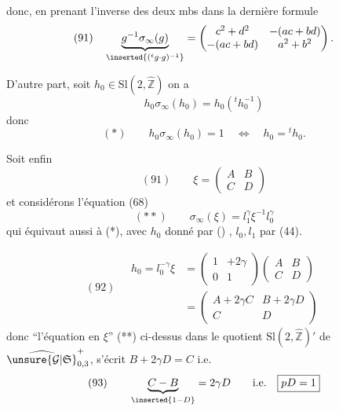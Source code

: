 
donc, en prenant l'inverse des deux mbs dans
la dernière formule
\[
(91)\quad \underbrace{g^{-1}\sigma_\infty(g)}_{\inserted{({}^t g\cdot g)^{-1}}}
=\begin{pmatrix}c^2+d^2&-(ac+bd)\\-(ac+bd)&a^2+b^2\end{pmatrix}.
\]

D'autre part, soit
$h_0\in\mathrm{Sl}(2,\widehat{\mathbb Z})$
on a
\[
h_0\sigma_\infty(h_0)=h_0({}^t h_0^{-1})
\]
donc
\[
(*)\qquad h_0\sigma_\infty(h_0)=1\quad\Longleftrightarrow\quad h_0={}^t h_0.
\]

Soit enfin
\[
(91)\qquad \xi=\begin{pmatrix}A&B\\C&D\end{pmatrix}
\]
et considérons l'équation (68)
\[
(**)\qquad \sigma_\infty(\xi)=l_1^\gamma\xi^{-1}l_0^\gamma
\]
qui équivaut aussi à (*), avec $h_0$ donné par ()
, $l_0,l_1$ par (44).


\[
(92)\quad\begin{aligned}
h_0=l_0^{-\gamma}\xi
&=\begin{pmatrix}1&+2\gamma\\0&1\end{pmatrix}
\begin{pmatrix}A&B\\C&D\end{pmatrix}\\
&=\begin{pmatrix}A+2\gamma C&B+2\gamma D\\C&D\end{pmatrix}
\end{aligned}
\]
donc ``l'équation en $\xi$'' (**) ci-dessus dans le
quotient $\mathrm{Sl}(2,\widehat{\mathbb Z})'$ de $\widehat{\unsure{\mathcal G|\mathfrak S}}_{0,3}^{+}$, s'écrit $B+2\gamma D=C$
i.e.
\[
(93)\qquad \underbrace{C-B}_{\inserted{1-D}}=2\gamma D
\qquad\text{i.e.}\quad\boxed{pD=1}
\]

